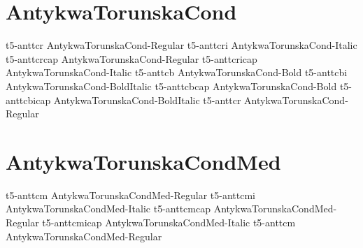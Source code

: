 \documentclass[sample]{vnsample}
\begin{document}
\section{AntykwaTorunskaCond}
     {t5-anttcr}     {AntykwaTorunskaCond-Regular}
    {t5-anttcri}    {AntykwaTorunskaCond-Italic}
    {t5-anttcrcap}  {AntykwaTorunskaCond-Regular}
  {t5-anttcricap} {AntykwaTorunskaCond-Italic}
     {t5-anttcb}     {AntykwaTorunskaCond-Bold}
    {t5-anttcbi}    {AntykwaTorunskaCond-BoldItalic}
    {t5-anttcbcap}  {AntykwaTorunskaCond-Bold}
  {t5-anttcbicap} {AntykwaTorunskaCond-BoldItalic}
     {t5-anttcr}     {AntykwaTorunskaCond-Regular}

\section{AntykwaTorunskaCondMed}
    {t5-anttcm}     {AntykwaTorunskaCondMed-Regular}
   {t5-anttcmi}    {AntykwaTorunskaCondMed-Italic}
   {t5-anttcmcap}  {AntykwaTorunskaCondMed-Regular}
 {t5-anttcmicap} {AntykwaTorunskaCondMed-Italic}
    {t5-anttcm}     {AntykwaTorunskaCondMed-Regular}
\end{document}
